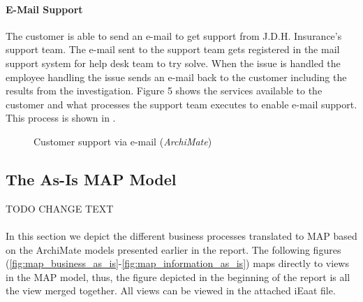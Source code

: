 \paragraph{E-Mail Support}
\label{sec:mail_support}
The customer is able to send an e-mail to get support from J.D.H. Insurance's support team. The e-mail sent to the support team gets registered in the mail support system for help desk team to try solve. When the issue is handled the employee handling the issue sends an e-mail back to the customer including the results from the investigation. Figure 5 shows the services available to the customer and what processes the support team executes to enable e-mail support. This process is shown in .
\begin{center}
	\begin{figure}[H]
		\centering
		\setlength\fboxsep{7pt}
		\setlength\fboxrule{0.5pt}
		\caption{Customer support via e-mail (\emph{ArchiMate})}
		\label{fig:archi_mail}
	\end{figure}
\end{center}
%
\subsection{The As-Is MAP Model}
\label{sec:as_is_map_model}
TODO CHANGE TEXT\\\\
In this section we depict the different business processes translated to MAP based on the ArchiMate models presented earlier in the report. The following figures (\ref{fig:map_business_as_is}-\ref{fig:map_information_as_is}) maps directly to views in the MAP model, thus, the figure depicted in the beginning of the report is all the view merged together. All views can be viewed in the attached iEaat file.
%
